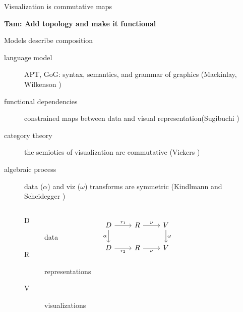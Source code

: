 \begin{frame}{Visualization is commutative maps}

    \pause
    \begin{center}
        \textbf{Tam: Add topology and make it functional}
    \end{center}
\end{frame}

\begin{frame}{Models describe composition}
    \begin{description}
        \item[language model] APT, GoG: syntax, semantics, and grammar of graphics (Mackinlay, Wilkenson  \cite{mackinlayAutomatingDesignGraphical1986, mackinlayAUTOMATICDESIGNGRAPHICAL1987,wilkinsonGrammarGraphics2005})
        \item[functional dependencies] constrained maps between data and visual representation(Sugibuchi \cite{sugibuchiFramwork2009}) 
        \item[category theory] the semiotics of visualization are commutative (Vickers \cite{vickersUnderstandingViz2013})
        \item[algebraic process] data ($\alpha$) and viz ($\omega$) transforms are symmetric (Kindlmann and Scheidegger \cite{kindlmannAlgebraicProcessVisualization2014})
        \begin{columns}
       
            \begin{description}
                \item[D] data 
                \item[R] representations
                \item[V] visualizations
            \end{description}
            \begin{equation*}
                \begin{tikzcd}[ampersand replacement=\&]
                    D \arrow[d, "\alpha"'] \arrow[r, "r_1"] \& R \arrow[r, "\nu"]  \& V \arrow[d, "\omega"] \\
                    D \arrow[r, "r_2"']                     \& R \arrow[r, "\nu"'] \& V                    
                \end{tikzcd}
                \end{equation*}
       
        \end{columns} 
     
    \end{description}
\end{frame}


